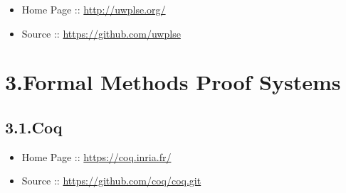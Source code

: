 \documentclass[12pt,twoside]{article}
\begin{document}
\begin{itemize}[noitemsep,topsep=\mdcompacttopsep]%

\item{}Home Page :: \href{http://uwplse.org/}{{\ttfamily http://\hspace{0pt}uwplse.\hspace{0pt}org/\hspace{0pt}}}%

\item{}Source :: \href{https://github.com/uwplse}{{\ttfamily https://\hspace{0pt}github.\hspace{0pt}com/\hspace{0pt}uwplse}}%
\end{itemize}%

\section{3.\hspace*{0.5em}Formal Methods Proof Systems}\label{sec-formal-methods-proof-systems}%

\subsection{3.1.\hspace*{0.5em}Coq}\label{sec-coq}%

\begin{itemize}[noitemsep,topsep=\mdcompacttopsep]%

\item{}Home Page :: \href{https://coq.inria.fr/}{{\ttfamily https://\hspace{0pt}coq.\hspace{0pt}inria.\hspace{0pt}fr/\hspace{0pt}}}%

\item{}Source :: \href{https://github.com/coq/coq.git}{{\ttfamily https://\hspace{0pt}github.\hspace{0pt}com/\hspace{0pt}coq/\hspace{0pt}coq.\hspace{0pt}git}}%
\end{itemize}%
\end{document}
